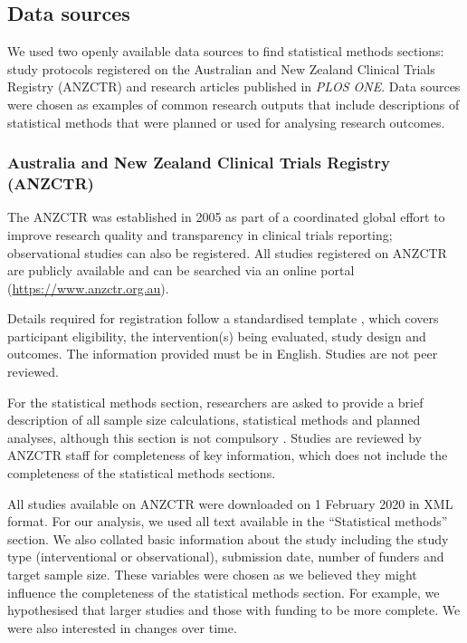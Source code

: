 \documentclass[12pt]{article}
\begin{document}
\subsection{Data sources}

We used two openly available data sources to find statistical methods
sections: study
protocols registered on the Australian and New Zealand Clinical Trials
Registry (ANZCTR) and research articles published in \emph{PLOS ONE}. Data sources were chosen as examples of common
research outputs that include descriptions of statistical methods that
were planned or used for analysing research outcomes.

\subsubsection{Australia and New Zealand Clinical Trials Registry (ANZCTR)}
\label{sec:methodsANZCTR}

The ANZCTR was established in 2005 as part of a coordinated global
effort to improve research quality and transparency in clinical trials
reporting; observational studies can also be registered. All studies
registered on ANZCTR are publicly available and can be searched via an
online portal (\url{https://www.anzctr.org.au}).

Details required for registration follow a standardised template
\citep{ANZCTR}, which covers participant eligibility, the
intervention(s) being evaluated, study design and outcomes. The
information provided must be in English. Studies are not peer reviewed.

For the statistical methods section, researchers are asked to provide a
brief description of all sample size calculations, statistical
methods and planned analyses, although this section is not compulsory
\citep{ANZCTR}. Studies are reviewed by ANZCTR staff for completeness of
key information, which does not include the completeness of the
statistical methods sections.

All studies available on ANZCTR were downloaded on 1 February 2020 in
XML format. For our analysis, we used all text available in the ``Statistical
methods'' section. We also collated basic information about the study
including the study type (interventional or observational), submission
date, number of funders and target sample size. These variables were
chosen as we believed they might influence the completeness of the
statistical methods section. For example, we hypothesised that larger studies and
those with funding to be more complete. We were also interested in
changes over time.
\end{document}
